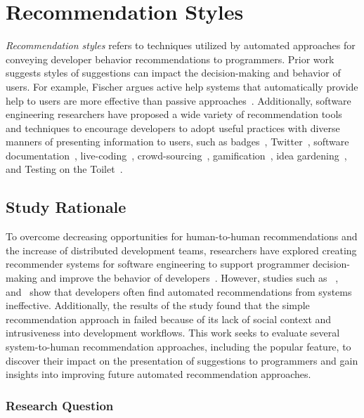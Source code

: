 


\section{Recommendation Styles}

\textit{Recommendation styles} refers to techniques utilized by automated approaches for conveying developer behavior recommendations to programmers. Prior work suggests styles of suggestions can impact the decision-making and behavior of users. For example, Fischer argues active help systems that automatically provide help to users are more effective than passive approaches~\cite{Fischer1984ActiveHelpSystems}. Additionally, software engineering researchers have proposed a wide variety of recommendation tools and techniques to encourage developers to adopt useful practices with diverse manners of presenting information to users, such as badges~\cite{trockman2018badges}, Twitter~\cite{singer2014twitter}, software documentation~\cite{Forward2002Documentation}, live-coding~\cite{blackwell2014collaboration}, crowd-sourcing~\cite{gordon2015codepourri}, gamification~\cite{barik2016game}, idea gardening~\cite{cao2012ideagarden}, and Testing on the Toilet~\cite{Murphy-Hill2019Toilet}.

\subsection{Study Rationale}

To overcome decreasing opportunities for human-to-human recommendations and the increase of distributed development teams, researchers have explored creating recommender systems for software engineering to support programmer decision-making and improve the behavior of developers~\cite{RSSE}. However, studies such as ~\cite{Hill2015Chatbots}, and~\cite{viriyakattiyaporn2009challenges} show that developers often find automated recommendations from systems ineffective. Additionally, the results of the \tele study found that the simple recommendation approach in \toolone failed because of its lack of social context and intrusiveness into development workflows. This work seeks to evaluate several system-to-human recommendation approaches, including the popular \suggs feature, to discover their impact on the presentation of suggestions to programmers and gain insights into improving future automated recommendation approaches.


\subsubsection{Research Question}

